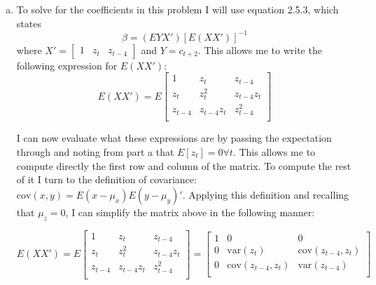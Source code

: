 \documentclass{homework}
\begin{document}
\begin{homeworkProblem}[Problem 2.6]
{\begin{enumerate}[a.]
          So solve for the covariance stationary covariance matrix, I simply used the command \texttt{doublej(A, C.dot(C.T))}. The matrix I got for $C_x$ is
          $$
          \begin{bmatrix}
            1.970 & 1.249 & 0.241 & 0.487 & 0.000\\
            1.249 & 1.970 & 0.071 & 0.241 & 0.000\\
            0.241 & 0.071 & 1.579 & 0.921 & 0.000\\
            0.487 & 0.241 & 0.921 & 1.579 & 0.000\\
            0.000 & 0.000 & 0.000 & 0.000 & 0.000\\
          \end{bmatrix}
          $$
      \item To solve for the coefficients in this problem I will use equation 2.5.3, which states $$\beta = (EYX') [E(XX')]^{-1}$$ where $X' = \left[\begin{smallmatrix} 1 & z_t & z_{t-4} \end{smallmatrix}\right]$ and $Y = c_{t+2}$. This allows me to write the following expression for $E(XX')$:
      $$
      E(XX') = E
      \begin{bmatrix}
      1 & z_t & z_{t-4} \\
      z_t & z_t^2 & z_{t-4} z_t \\
      z_{t-4} & z_{t-4} z_t & z_{t-4}^2 \\
      \end{bmatrix}
      $$

      I can now evaluate what these expressions are by passing the expectation through and noting from part a that $E[z_t] =0 \forall t$. This allows me to compute directly the first row and column of the matrix. To compute the rest of it I turn to the definition of covariance: $\text{cov}(x, y) = E(x - \mu_x) E(y - \mu_y)'$. Applying this definition and recalling that $\mu_z= 0$, I can simplify the matrix above in the following manner:

      $$
      E(XX') = E
      \begin{bmatrix}
      1 & z_t & z_{t-4} \\
      z_t & z_t^2 & z_{t-4} z_t \\
      z_{t-4} & z_{t-4} z_t & z_{t-4}^2 \\
      \end{bmatrix}
      =
      \begin{bmatrix}
      1 & 0 & 0 \\
      0 & \text{var}(z_t) & \text{cov}(z_{t-4}, z_t) \\
      0 & \text{cov}(z_{t-4}, z_t) & \text{var}(z_{t-4}) \\
      \end{bmatrix}
      $$


\end{enumerate}}
\end{homeworkProblem}
\end{document}
